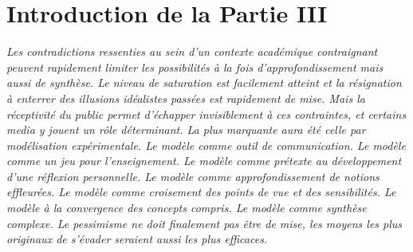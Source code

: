 



\chapter*{Introduction de la Partie III}






\textit{Les contradictions ressenties au sein d'un contexte académique contraignant peuvent rapidement limiter les possibilités à la fois d'approfondissement mais aussi de synthèse. Le niveau de saturation est facilement atteint et la résignation à enterrer des illusions idéalistes passées est rapidement de mise. Mais la réceptivité du public permet d'échapper invisiblement à ces contraintes, et certains media y jouent un rôle déterminant. La plus marquante aura été celle par modélisation expérimentale. Le modèle comme outil de communication. Le modèle comme un jeu pour l'enseignement. Le modèle comme prétexte au développement d'une réflexion personnelle. Le modèle comme approfondissement de notions effleurées. Le modèle comme croisement des points de vue et des sensibilités. Le modèle à la convergence des concepts compris. Le modèle comme synthèse complexe. Le pessimisme ne doit finalement pas être de mise, les moyens les plus originaux de s'évader seraient aussi les plus efficaces.}




\bigskip


